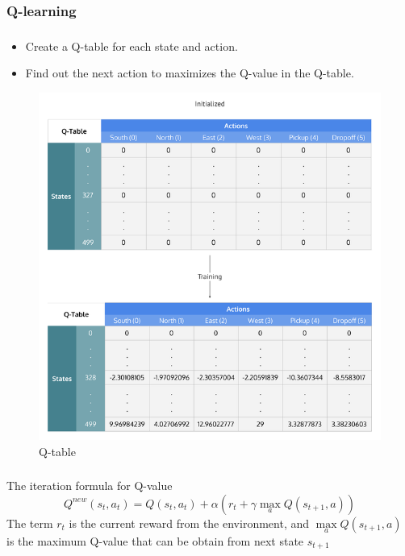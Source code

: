 \documentclass{beamer}
\begin{document}
    \subsubsection*{Q-learning}
    \begin{frame}
        \frametitle{\subsubsecname}
        \begin{itemize}
            \item Create a Q-table for each state and action.
            \item Find out the next action to maximizes the Q-value in the Q-table.
        \end{itemize}

        \begin{figure}
            \centering
            \includegraphics[scale=.2]{figs/Qtable.png}
            \caption{Q-table}
        \end{figure}

    \end{frame}

    \begin{frame}
        \frametitle{\subsubsecname}

        The iteration formula for Q-value
        $$Q^{new}(s_t, a_t) = Q(s_t, a_t) + \alpha(r_t + \gamma\max_{a}Q(s_{t+1}, a))$$
        The term $r_t$ is the current reward from the environment, and $\max\limits_{a}Q(s_{t+1}, a)$ is the maximum Q-value that can be obtain from next state $s_{t+1}$

    \end{frame}
\end{document}
